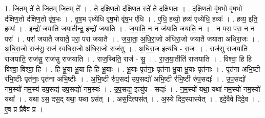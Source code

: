 \documentclass[17pt]{extarticle}
\begin{document}
1. जि॒तम् ते॑ ते जि॒तम् जि॒तम् ते᳚ । . ते॒ द॒क्षि॒ण॒तो द॑क्षिण॒त स्ते॑ ते दक्षिण॒तः । . द॒क्षि॒ण॒तो वृ॑ष॒भो वृ॑ष॒भो द॑क्षिण॒तो द॑क्षिण॒तो वृ॑ष॒भः । . वृ॒ष॒भ ए᳚ध्येधि वृष॒भो वृ॑ष॒भ ए॑धि । . ए॒धि॒ हव्यो॒ हव्य॑ एध्येधि॒ हव्यः॑ । . हव्य॒ इति॒ हव्यः॑ । . इन्द्रो॑ जयाति जया॒तीन्द्र॒ इन्द्रो॑ जयाति । . ज॒या॒ति॒ न न ज॑याति जयाति॒ न । . न परा॒ परा॒ न न परा᳚ । . परा॑ जयातै जयातै॒ परा॒ परा॑ जयातै । . ज॒या॒ता॒ अ॒धि॒रा॒जो अ॑धिरा॒जो ज॑यातै जयाता अधिरा॒जः । . अ॒धि॒रा॒जो राज॑सु॒ राज॑ स्वधिरा॒जो अ॑धिरा॒जो राज॑सु । . अ॒धि॒रा॒ज इत्य॑धि - रा॒जः । . राज॑सु राजयाति राजयाति॒ राज॑सु॒ राज॑सु राजयाति । . राज॒स्विति॒ राज॑ - सु॒ । . रा॒ज॒या॒तीति॑ राजयाति । . विश्वा॒ हि हि विश्वा॒ विश्वा॒ हि । . हि भू॒या भू॒या हि हि भू॒याः । . भू॒याः पृत॑नाः॒ पृत॑ना भू॒या भू॒याः पृत॑नाः । . पृत॑ना अभि॒ष्टी र॑भि॒ष्टीः पृत॑नाः॒ पृत॑ना अभि॒ष्टीः । . अ॒भि॒ष्टी रु॑प॒सद्य॑ उप॒सद्यो॑ अभि॒ष्टी र॑भि॒ष्टी रु॑प॒सद्यः॑ । . उ॒प॒सद्यो॑ नम॒स्यो॑ नम॒स्य॑ उप॒सद्य॑ उप॒सद्यो॑ नम॒स्यः॑ । . उ॒प॒सद्य॒ इत्यु॑प - सद्यः॑ । . न॒म॒स्यो॑ यथा॒ यथा॑ नम॒स्यो॑ नम॒स्यो॑ यथा᳚ । . यथा ऽस॒ दस॒द् यथा॒ यथा ऽस॑त् । . अस॒दित्यस॑त् । . अ॒स्ये दिद॒स्यास्येत् । . इदे॒वैवे दिदे॒व । . ए॒व प्र प्रैवैव प्र । \newline
\end{document}
